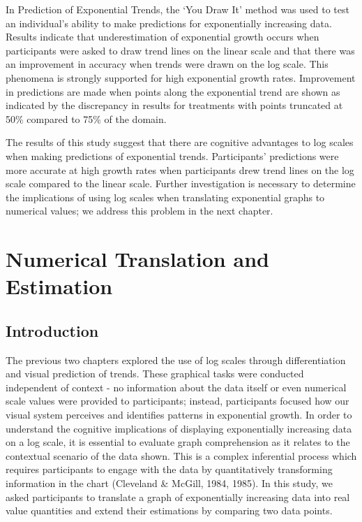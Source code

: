 \documentclass[print]{nuthesis}
\begin{document}
In Prediction of Exponential Trends, the `You Draw It' method was used to test an individual's ability to make predictions for exponentially increasing data.
Results indicate that underestimation of exponential growth occurs when participants were asked to draw trend lines on the linear scale and that there was an improvement in accuracy when trends were drawn on the log scale.
This phenomena is strongly supported for high exponential growth rates.
Improvement in predictions are made when points along the exponential trend are shown as indicated by the discrepancy in results for treatments with points truncated at 50\% compared to 75\% of the domain.

The results of this study suggest that there are cognitive advantages to log scales when making predictions of exponential trends.
Participants' predictions were more accurate at high growth rates when participants drew trend lines on the log scale compared to the linear scale.
Further investigation is necessary to determine the implications of using log scales when translating exponential graphs to numerical values; we address this problem in the next chapter.

\hypertarget{estimation}{%
\chapter{Numerical Translation and Estimation}\label{estimation}}

\hypertarget{introduction-2}{%
\section{Introduction}\label{introduction-2}}

The previous two chapters explored the use of log scales through differentiation and visual prediction of trends.
These graphical tasks were conducted independent of context - no information about the data itself or even numerical scale values were provided to participants; instead, participants focused how our visual system perceives and identifies patterns in exponential growth.
In order to understand the cognitive implications of displaying exponentially increasing data on a log scale, it is essential to evaluate graph comprehension as it relates to the contextual scenario of the data shown.
This is a complex inferential process which requires participants to engage with the data by quantitatively transforming information in the chart (Cleveland \& McGill, 1984, 1985).
In this study, we asked participants to translate a graph of exponentially increasing data into real value quantities and extend their estimations by comparing two data points.
\end{document}
